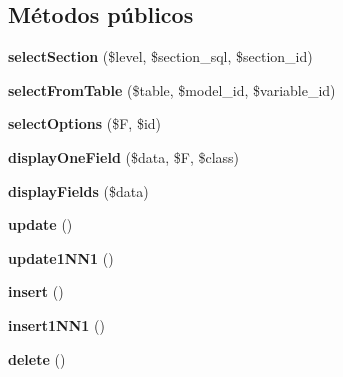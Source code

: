\subsection*{\-Métodos públicos}
\begin{DoxyCompactItemize}
\item 
\hypertarget{classadminblock_a5a9c45c8bdb32b8cb34341c0651e8970}{{\bfseries select\-Section} (\$level, \$section\-\_\-sql, \$section\-\_\-id)}\label{classadminblock_a5a9c45c8bdb32b8cb34341c0651e8970}

\item 
\hypertarget{classadminblock_a799a5af3e9759b2a1b6f110940fd03cf}{{\bfseries select\-From\-Table} (\$table, \$model\-\_\-id, \$variable\-\_\-id)}\label{classadminblock_a799a5af3e9759b2a1b6f110940fd03cf}

\item 
\hypertarget{classadminblock_a37317b2ea7f1da508d561befcc232af7}{{\bfseries select\-Options} (\$\-F, \$id)}\label{classadminblock_a37317b2ea7f1da508d561befcc232af7}

\item 
\hypertarget{classadminblock_ada80fd6066d96b488861e47485db043f}{{\bfseries display\-One\-Field} (\$data, \$\-F, \$class)}\label{classadminblock_ada80fd6066d96b488861e47485db043f}

\item 
\hypertarget{classadminblock_a7bb1e8f357803f17830becbd417588ae}{{\bfseries display\-Fields} (\$data)}\label{classadminblock_a7bb1e8f357803f17830becbd417588ae}

\item 
\hypertarget{classadminblock_a2aaea9bf7d5956dfb59322a7009b2538}{{\bfseries update} ()}\label{classadminblock_a2aaea9bf7d5956dfb59322a7009b2538}

\item 
\hypertarget{classadminblock_ab7be1803fca03951754c864962aa072d}{{\bfseries update1\-N\-N1} ()}\label{classadminblock_ab7be1803fca03951754c864962aa072d}

\item 
\hypertarget{classadminblock_a6c3808e99afabab0fb51663ea7a972a4}{{\bfseries insert} ()}\label{classadminblock_a6c3808e99afabab0fb51663ea7a972a4}

\item 
\hypertarget{classadminblock_a85f955923111d4f0096b183a35bd10f2}{{\bfseries insert1\-N\-N1} ()}\label{classadminblock_a85f955923111d4f0096b183a35bd10f2}

\item 
\hypertarget{classadminblock_a7951b7fba32a86503b434b99b926b16c}{{\bfseries delete} ()}\label{classadminblock_a7951b7fba32a86503b434b99b926b16c}


\end{DoxyCompactItemize}
